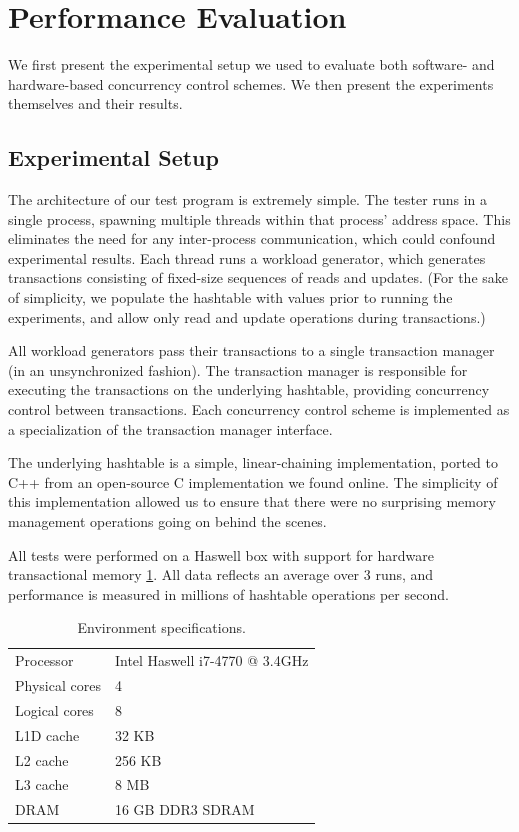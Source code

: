 \section{Performance Evaluation} \label{sec:eval}
We first present the experimental setup we used to evaluate both software- and hardware-based concurrency control schemes. We then present the experiments themselves and their results.

\subsection{Experimental Setup}
The architecture of our test program is extremely simple. The tester runs in a
single process, spawning multiple threads within that process' address
space. This eliminates the need for any inter-process communication, which could
confound experimental results. Each thread runs a workload generator, which
generates transactions consisting of fixed-size sequences of reads and
updates. (For the sake of simplicity, we populate the hashtable with values
prior to running the experiments, and allow only read and update operations
during transactions.)

All workload generators pass their transactions to a single transaction manager
(in an unsynchronized fashion). The transaction manager is responsible for
executing the transactions on the underlying hashtable, providing concurrency
control between transactions. Each concurrency control scheme is implemented as
a specialization of the transaction manager interface.

The underlying hashtable is a simple, linear-chaining implementation, ported to
C++ from an open-source C implementation we found online. The simplicity of this
implementation allowed us to ensure that there were no surprising memory
management operations going on behind the scenes.

All tests were performed on a Haswell box with support for hardware
transactional memory \cref{tab:specs}. All data reflects an average over 3 runs, and
performance is measured in millions of hashtable operations per second.

\begin{table}
\centering
\small{
  \centering
  \begin{tabular}{ll} \toprule
   Processor      &  Intel Haswell i7-4770 @ 3.4GHz \\
   Physical cores &  4  \\
   Logical cores  &  8  \\
   L1D cache      &  32 KB  \\
   L2 cache       &  256 KB \\
   L3 cache       &  8 MB   \\
   DRAM           & 16 GB DDR3 SDRAM \\
   \bottomrule
   \end{tabular}
 }
\caption{Environment specifications.}
\label{tab:specs}
\end{table}

